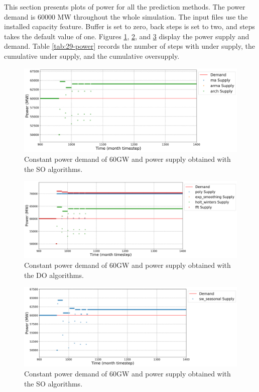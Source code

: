 \documentclass[11pt]{article}
\begin{document}
This section presents plots of power for all the prediction methods. The power demand is 60000 MW throughout the whole simulation. The input files use the installed capacity feature. Buffer is set to zero, back steps is set to two, and steps takes the default value of one.
Figures \ref{fig:29-NO}, \ref{fig:29-DO}, and \ref{fig:29-SO} display the power supply and demand.
Table \ref{tab:29-power} records the number of steps with under supply, the cumulative under supply, and the cumulative oversupply.

\begin{figure}[H]
	\centering
	\includegraphics[width=\textwidth]{29-figures/29-power0-buffer01.png} 
	\hfill
	\caption{Constant power demand of 60GW and power supply obtained with the SO algorithms.}
	\label{fig:29-NO}
\end{figure}

\begin{figure}[H]
	\centering
	\includegraphics[width=\textwidth]{29-figures/29-power0-buffer02.png} 
	\hfill
	\caption{Constant power demand of 60GW and power supply obtained with the DO algorithms.}
	\label{fig:29-DO}
\end{figure}

\begin{figure}[H]
	\centering
	\includegraphics[width=\textwidth]{29-figures/29-power0-buffer03.png} 
	\hfill
	\caption{Constant power demand of 60GW and power supply obtained with the SO algorithms.}
	\label{fig:29-SO}
\end{figure}
\end{document}
